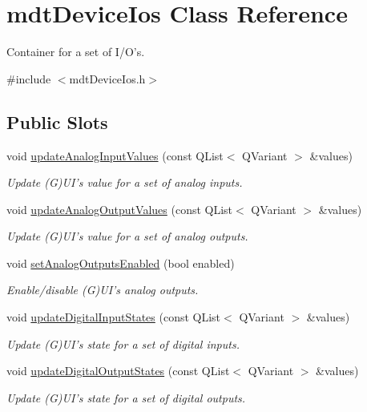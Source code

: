\hypertarget{classmdt_device_ios}{
\section{mdtDeviceIos Class Reference}
\label{classmdt_device_ios}
}


Container for a set of I/O's.  




{\ttfamily \#include $<$mdtDeviceIos.h$>$}

\subsection*{Public Slots}
\begin{DoxyCompactItemize}
\item 
void \hyperlink{classmdt_device_ios_a82850ee99957ec5a787de71299ad785b}{updateAnalogInputValues} (const QList$<$ QVariant $>$ \&values)
\begin{DoxyCompactList}\small\item\em Update (G)UI's value for a set of analog inputs. \end{DoxyCompactList}\item 
void \hyperlink{classmdt_device_ios_a2c40cf4749cff1ade292bdd81bc195e9}{updateAnalogOutputValues} (const QList$<$ QVariant $>$ \&values)
\begin{DoxyCompactList}\small\item\em Update (G)UI's value for a set of analog outputs. \end{DoxyCompactList}\item 
\hypertarget{classmdt_device_ios_ae266924a427fbc896e5f9774890ec91f}{
void \hyperlink{classmdt_device_ios_ae266924a427fbc896e5f9774890ec91f}{setAnalogOutputsEnabled} (bool enabled)}
\label{classmdt_device_ios_ae266924a427fbc896e5f9774890ec91f}

\begin{DoxyCompactList}\small\item\em Enable/disable (G)UI's analog outputs. \end{DoxyCompactList}\item 
void \hyperlink{classmdt_device_ios_a9a7582771eca2b54261ff00212c09146}{updateDigitalInputStates} (const QList$<$ QVariant $>$ \&values)
\begin{DoxyCompactList}\small\item\em Update (G)UI's state for a set of digital inputs. \end{DoxyCompactList}\item 
void \hyperlink{classmdt_device_ios_ae9542163fedce98b11e2d9fd0e2e7d78}{updateDigitalOutputStates} (const QList$<$ QVariant $>$ \&values)
\begin{DoxyCompactList}\small\item\em Update (G)UI's state for a set of digital outputs. \end{DoxyCompactList}\end{DoxyCompactItemize}
